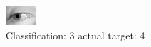 \begin{figure}[h!]
\begin{center}
\includegraphics[width=0.60\columnwidth]{figures/ID3051_class_3_target_4.png}
\end{center}
\caption{ Classification: 3 actual target: 4}
\label{fig:ID3051_class_3_target_4}
\end{figure}
